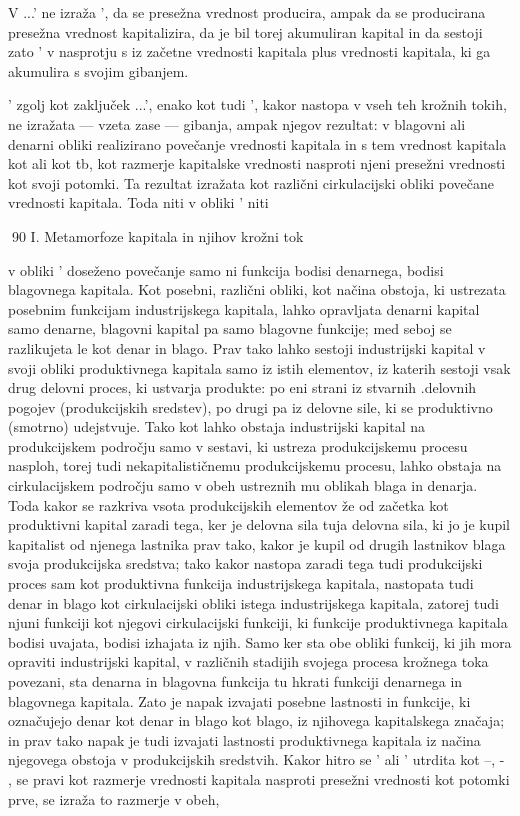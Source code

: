 \documentclass[kapital_02.tex]{subfiles}
\begin{document}
V \KPEP...\KPEP' ne izraža \KPEP', da se presežna vrednost producira, ampak da se producirana presežna vrednost kapitalizira, da je bil torej akumuliran kapital in da sestoji zato \KPEP' v nasprotju s \KPEP iz začetne vrednosti kapitala plus vrednosti kapitala, ki ga akumulira s svojim gibanjem.

\KPED' zgolj kot zaključek \KPED...\KPED', enako kot tudi \KPEB', kakor nastopa v vseh teh krožnih tokih, ne izražata — vzeta zase — gibanja, ampak njegov rezultat: v blagovni ali denarni obliki realizirano povečanje vrednosti kapitala in s tem vrednost kapitala kot \KPED \KPEd ali kot \KPEB tb, kot razmerje kapitalske vrednosti nasproti njeni presežni vrednosti kot svoji potomki. Ta rezultat izražata kot različni cirkulacijski obliki povečane vrednosti kapitala. Toda niti v obliki \KPEB' niti



90 I. Metamorfoze kapitala in njihov krožni tok



 v obliki \KPED' doseženo povečanje samo ni funkcija bodisi denarnega, bodisi blagovnega kapitala. Kot posebni, različni obliki, kot načina obstoja, ki ustrezata posebnim funkcijam industrijskega kapitala, lahko opravljata denarni kapital samo denarne, blagovni kapital pa samo blagovne funkcije; med seboj se razlikujeta le kot denar in blago. Prav tako lahko sestoji industrijski kapital v svoji obliki produktivnega kapitala samo iz istih elementov, iz katerih sestoji vsak drug delovni proces, ki ustvarja produkte: po eni strani iz stvarnih .delovnih pogojev (produkcijskih sredstev), po drugi pa iz delovne sile, ki se produktivno (smotrno) udejstvuje. Tako kot lahko obstaja industrijski kapital na produkcijskem področju samo v sestavi, ki ustreza produkcijskemu procesu nasploh, torej tudi nekapitalističnemu produkcijskemu procesu, lahko obstaja na cirkulacijskem področju samo v obeh ustreznih mu oblikah blaga in denarja. Toda kakor se razkriva vsota produkcijskih elementov že od začetka kot produktivni kapital zaradi tega, ker je delovna sila tuja delovna sila, ki jo je kupil kapitalist od njenega lastnika prav tako, kakor je kupil od drugih lastnikov blaga svoja produkcijska sredstva; tako kakor nastopa zaradi tega tudi produkcijski proces sam kot produktivna funkcija industrijskega kapitala, nastopata tudi denar in blago kot cirkulacijski obliki istega industrijskega kapitala, zatorej tudi njuni funkciji kot njegovi cirkulacijski funkciji, ki funkcije produktivnega kapitala bodisi uvajata, bodisi izhajata iz njih. Samo ker sta obe obliki funkcij, ki jih mora opraviti industrijski kapital, v različnih stadijih svojega procesa krožnega toka povezani, sta denarna in blagovna funkcija tu hkrati funkciji denarnega in blagovnega kapitala. Zato je napak izvajati posebne lastnosti in funkcije, ki označujejo denar kot denar in blago kot blago, iz njihovega kapitalskega značaja; in prav tako napak je tudi izvajati lastnosti produktivnega kapitala iz načina njegovega obstoja v produkcijskih sredstvih. Kakor hitro se \KPED' ali \KPEB' utrdita kot \KPED --\KPEd, \KPEB - \KPEb, se pravi kot razmerje vrednosti kapitala nasproti presežni vrednosti kot potomki prve, se izraža to razmerje v obeh,
\end{document}

